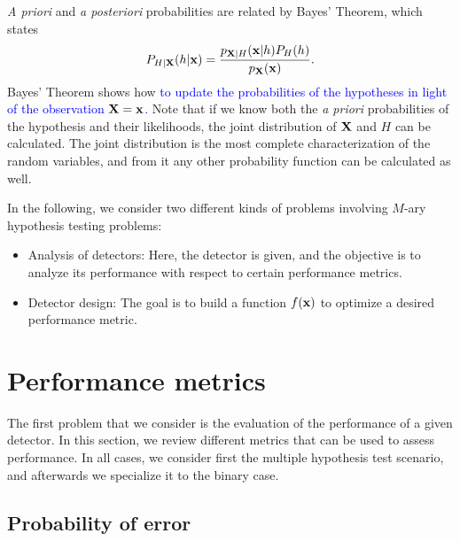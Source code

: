 {\em A priori} and {\em a posteriori} probabilities are related by Bayes' Theorem, which states
    $$P_{H|{\bf X}}(h|{\bf x}) = \frac{p_{{\bf  X} | H}({\bf x}|h) P_H(h)}{p_{\bf X}({\bf x})}.$$
Bayes' Theorem shows how \textcolor{blue}{to update the probabilities of the hypotheses in light of the observation ${\bf X}={\bf x}$.} Note that if we know both the {\em a priori} probabilities of the hypothesis and their likelihoods, the joint distribution of $\bf X$ and $H$ can be calculated. The joint distribution is the most complete characterization of the random variables, and from it any other probability function can be calculated as well.

In the following, we consider two different kinds of problems involving $M$-ary hypothesis testing problems:
\begin{itemize}
\item Analysis of detectors: Here, the detector is given, and the objective is to analyze its performance with respect to certain performance metrics.
\item Detector design: The goal is to build a function $f(\bf x)$ to optimize a desired performance metric.
\end{itemize}

\section{Performance metrics}
\label{subsec:analysis}

The first problem that we consider is the evaluation of the performance of a given detector. In this section, we review different metrics that can be used to assess performance. In all cases, we consider first the multiple hypothesis test scenario, and afterwards we specialize it to the binary case.

\subsection{Probability of error}

